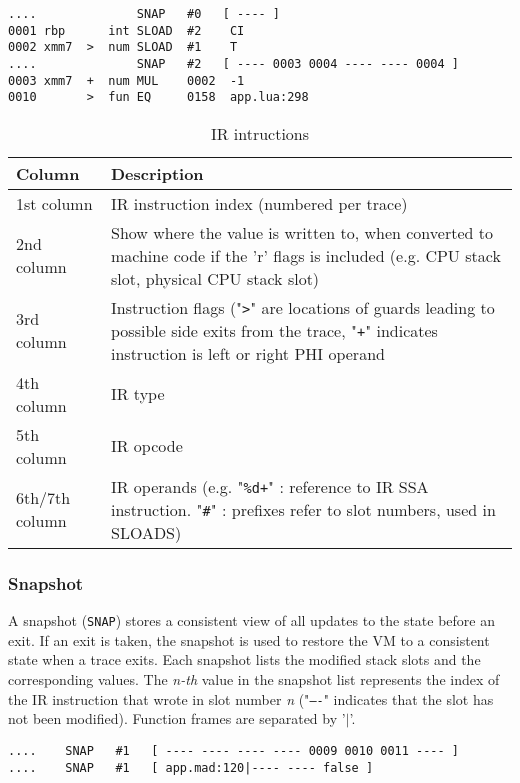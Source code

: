 \begin{lstlisting}[style=CommandsLuaJIT]
....              SNAP   #0   [ ---- ]
0001 rbp      int SLOAD  #2    CI
0002 xmm7  >  num SLOAD  #1    T
....              SNAP   #2   [ ---- 0003 0004 ---- ---- 0004 ]
0003 xmm7  +  num MUL    0002  -1
0010       >  fun EQ     0158  app.lua:298
\end{lstlisting}

\begin{table}[H]
\centering
\begin{tabular}{ |p{2.8cm}|p{10.5cm}|} 
 \hline
 Column & Description \\
 \hline
 1st column & IR instruction index (numbered per trace)\\
 2nd column & Show where the value is written to, when converted to machine code if the 'r' flags is included (e.g. CPU stack slot, physical CPU stack slot)\\
 3rd column & Instruction flags ("\texttt{\textgreater}" are locations of guards leading to possible side exits from the trace,  "\texttt{+}" indicates instruction is left or right PHI operand\\
 4th column & IR type\\
 5th column & IR opcode\\
 6th/7th column & IR operands (e.g. "\texttt{\%d+}" : reference to IR SSA instruction. "\texttt{\#}" : prefixes refer to slot numbers, used in SLOADS)\\
 \hline
\end{tabular}
\caption{IR intructions}
\end{table}

\subsubsection{Snapshot}

\noindent
A snapshot (\texttt{SNAP}) stores a consistent view of all updates to the state before an exit. If an exit is taken, the snapshot is used to restore the VM to a consistent state when a trace exits. Each snapshot lists the modified stack slots and the corresponding values. The \textit{n-th} value in the snapshot list represents the index of the IR instruction that wrote in slot number \textit{n} ("\texttt{----}" indicates that the slot has not been modified). Function frames are separated by '$\vert$'.

\begin{lstlisting}[style=CommandsLuaJIT]
....    SNAP   #1   [ ---- ---- ---- ---- 0009 0010 0011 ---- ]
....    SNAP   #1   [ app.mad:120|---- ---- false ]
\end{lstlisting}

